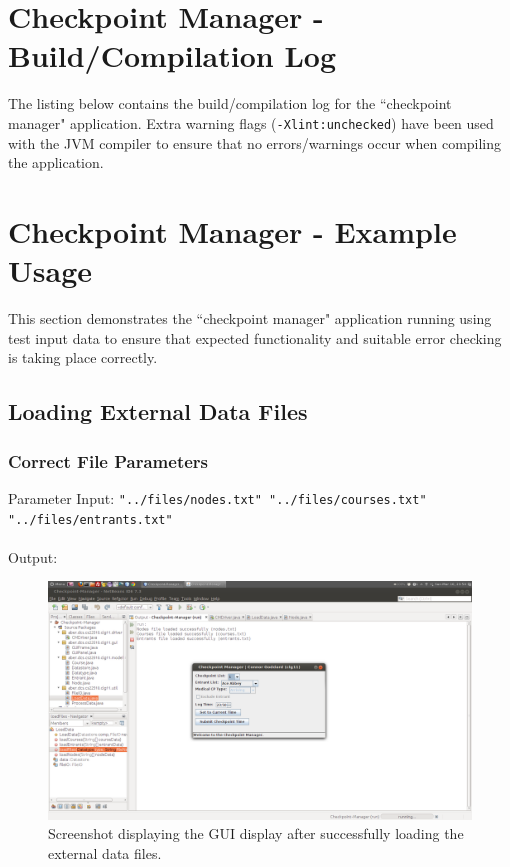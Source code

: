 \documentclass[a4paper, 10pt]{article}
\begin{document}
\clearpage
\section{Checkpoint Manager - Build/Compilation Log}

The listing below contains the build/compilation log for the ``checkpoint manager" application. Extra warning flags (\verb+-Xlint:unchecked+) have been used with the JVM compiler to ensure that no errors/warnings occur when compiling the application. \\



\clearpage
\section{Checkpoint Manager - Example Usage}
This section demonstrates the ``checkpoint manager" application running using test input data to ensure that expected functionality and suitable error checking is taking place correctly.\\

\subsection{Loading External Data Files}

\subsubsection{Correct File Parameters}

Parameter Input: \verb+"../files/nodes.txt" "../files/courses.txt" "../files/entrants.txt"+ \\\\
Output:


\begin{figure}[ht!]
\centering
\includegraphics[scale=0.3]{cm-loadsuccess.png}
\caption{Screenshot displaying the GUI display after successfully loading the external data files.}
\end{figure}
\end{document}
